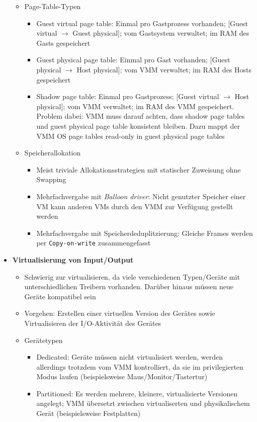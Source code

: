 \begin{itemize}
\begin{itemize}
		\item Page-Table-Typen
		\begin{itemize}
			\item Guest virtual page table: Einmal pro Gastprozess vorhanden; [Guest virtual \(\rightarrow\) Guest physical]; vom Gastsystem verwaltet; im RAM des Gasts gespeichert
			\item Guest physical page table: Einmal pro Gast vorhanden; [Guest physical \(\rightarrow\) Host physical]; vom VMM verwaltet; im RAM des Hosts gespeichert
			\item Shadow page table: Einmal pro Gastprozess; [Guest virtual \(\rightarrow\) Host physical]; vom VMM verwaltet; im RAM des VMM gespeichert. Problem dabei: VMM muss darauf achten, dass shadow page tables und guest physical page table konsistent bleiben. Dazu mappt der VMM OS page tables read-only in guest physical page tables
		\end{itemize}
		\item Speicherallokation
		\begin{itemize}
			\item Meist triviale Allokationsstrategien mit statischer Zuweisung ohne Swapping
			\item Mehrfachvergabe mit \textit{Balloon driver}: Nicht genutzter Speicher einer VM kann anderen VMs durch den VMM zur Verfügung gestellt werden
			\item Mehrfachvergabe mit Speicherdeduplitzierung: Gleiche Frames werden per \texttt{Copy-on-write} zusammengefasst
		\end{itemize}
	\end{itemize}
	\item \textbf{Virtualisierung von Input/Output}
	\begin{itemize}
		\item Schwierig zur virtualisieren, da viele verschiedenen Typen/Geräte mit unterschiedlichen Treibern vorhanden. Darüber hinaus müssen neue Geräte kompatibel sein
		\item Vorgehen: Erstellen einer virtuellen Version des Gerätes sowie Virtualisieren der I/O-Aktivität des Gerätes
		\item Gerätetypen
		\begin{itemize}
			\item Dedicated: Geräte müssen nicht virtualisiert werden, werden allerdings trotzdem vom VMM kontrolliert, da sie im privilegierten Modus laufen (beispielsweise Maus/Monitor/Tastertur)
			\item Partitioned: Es werden mehrere, kleinere, virtualisierte Versionen angelegt; VMM übersetzt zwischen virtualiserten und physikalischem Gerät (beispielsweise Festplatten)

\end{itemize}
\end{itemize}
\end{itemize}
